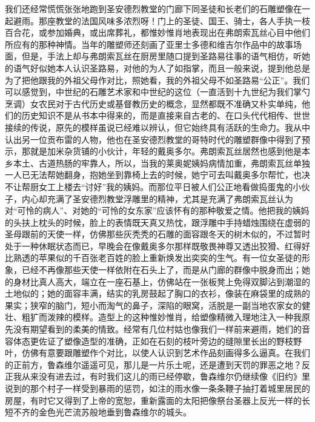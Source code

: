 \par 我们还经常慌慌张张地跑到圣安德烈教堂的门廊下同圣徒和长老们的石雕塑像在一起避雨。那座教堂的法国风味多浓烈呀！门上的圣徒、国王、骑士，各人手执一枝百合花，或参加婚典，或出席葬礼，都惟妙惟肖地表现出在弗朗索瓦丝心目中他们所应有的那种神情。当年的雕塑师还刻画了亚里士多德和维吉尔作品中的故事场面，但是，手法上却与弗朗索瓦丝在厨房里随口提到圣路易往事的语气相仿，听她的语气好似她本人认识圣路易，对他的为人了如指掌，而且一般来说，提到他总是为了把他跟我的外祖父母作对比，照她看，我的外祖父母不如圣路易“公正”。我们可以感觉到，中世纪的石雕艺术家和中世纪的这位（一直活到十九世纪为我们掌勺烹调）女农民对于古代历史或基督教历史的概念，显然都既不准确又朴实单纯，他们的历史知识不是从书本中得来的，而是直接来自古老的、在口头代代相传、世世接续的传说，原先的模样虽说已经难以辨认，但它始终具有活跃的生命力。我从中认出另一位贡布雷的人物，他也在圣安德烈教堂的哥特时代的雕塑群像中得到了预示，那就是加米杂货铺的小伙计，年轻的戴奥多尔。弗朗索瓦丝居然也感到他是本乡本土、古道热肠的牢靠人，所以，当我的莱奥妮姨妈病情加重，弗朗索瓦丝单独一人已无法帮她翻身，抱她坐到靠椅上去的时候，她宁可去叫戴奥多尔帮忙，也决不让帮厨女工上楼去“讨好”我的姨妈。而那位平日被人们公正地看做捣蛋鬼的小伙子，内心却充满了圣安德烈教堂浮雕里的精神，尤其是充满了弗朗索瓦丝认为对“可怜的病人”、对她的“可怜的女东家”应该怀有的那种敬爱之情。他把我的姨妈的头扶上枕头的时候，脸上的表情既天真又热忱，跟浮雕中手持蜡烛围绕在虚弱的圣母跟前的天使一样，仿佛那些灰秃秃的石雕的面容跟冬天的树木似的，不过暂时处于一种休眠状态而已，早晚会在像戴奥多尔那样既敬畏神尊又透出狡猾、红得好比熟透的苹果似的千百张老百姓的脸上重新焕发出奕奕的生气。有一位女圣徒的形象，已经不再像那些天使一样依附在石头上了，而是从门廊的群像中脱身而出；她的身材比真人高大，端立在一座石基上，仿佛站在一张板凳上免得双脚沾到潮湿的土地似的；她的面容丰满，结实的乳房鼓起了胸口的衣衫，像装在麻袋里的成熟的果实；狭窄的脑门，短小而淘气的鼻子，深陷的眼窝，活脱是一副当地农家女的健壮、粗犷而泼辣的模样。造型上的这种惟妙惟肖，给塑像精微入理地注入一种我原先没有期望看到的柔美的情致。经常有几位村姑也像我们一样前来避雨，她们的音容体态更佐证了塑像造型的准确，正如在石刻的枝叶旁边的缝隙里长出的野枝野叶，仿佛有意要跟雕塑作个对比，以使人认识到艺术作品刻画得多么逼真。在我们的正前方，鲁森维尔遥遥可见，那儿是一片乐土呢，还是遭到天罚的罪恶之地？反正我从来没有进去过，有时我们这儿的雨已经停歇，鲁森维尔仍继续像《旧约》里说到的那个村子一样受到暴雨的惩罚，如注的雨水像一条条鞭子抽打着城里居民的房屋，有时它又得到了上帝的宽恕，重新露面的太阳把像祭台圣器上反光一样的长短不齐的金色光芒流苏般地垂到鲁森维尔的城头。
